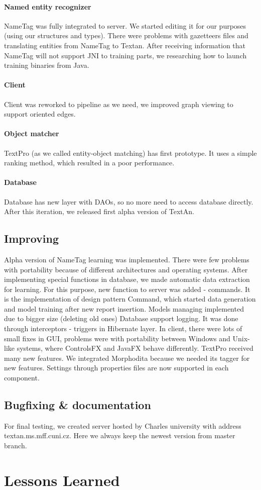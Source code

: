 \paragraph{Named entity recognizer} NameTag was fully integrated to server. We 
started editing it for our purposes (using our structures and types). There were
problems with gazetteers files and translating entities from NameTag to Textan.
After receiving information that NameTag will not support JNI to training parts,
 we researching how to launch training binaries from Java.
\paragraph{Client} Client was reworked to pipeline as we need, we improved graph
 viewing to support oriented edges.
\paragraph{Object matcher} TextPro (as we called entity-object matching) has first
 prototype. It uses a simple ranking method, which resulted in a poor performance. 
\paragraph{Database} Database has new layer with DAOs, so no more need to access
database directly. After this iteration, we released first alpha version of TextAn.

\subsection{Improving}
Alpha version of NameTag learning was implemented. There were few problems with
portability because of different architectures and operating systems. After
implementing special functions in database, we made automatic data extraction for
learning. For this purpose, new function to server was added - commands. It is
the implementation of design pattern Command, which started data generation and
model training after new report insertion. Models managing implemented due to
bigger size (deleting old ones) Database support logging. It was done through
interceptors - triggers in Hibernate layer. In client, there were lots of small
fixes in GUI, problems were with portability between Windows and Unix-like systems,
where ControlsFX and JavaFX behave differently. TextPro received many new features.
We integrated Morphodita because we needed its tagger for new features.
Settings through properties files are now supported in each component.

\subsection{Bugfixing \& documentation}
For final testing, we created server hosted by Charles university with address textan.ms.mff.cuni.cz.
Here we always keep the newest version from master branch.

\section{Lessons Learned}
